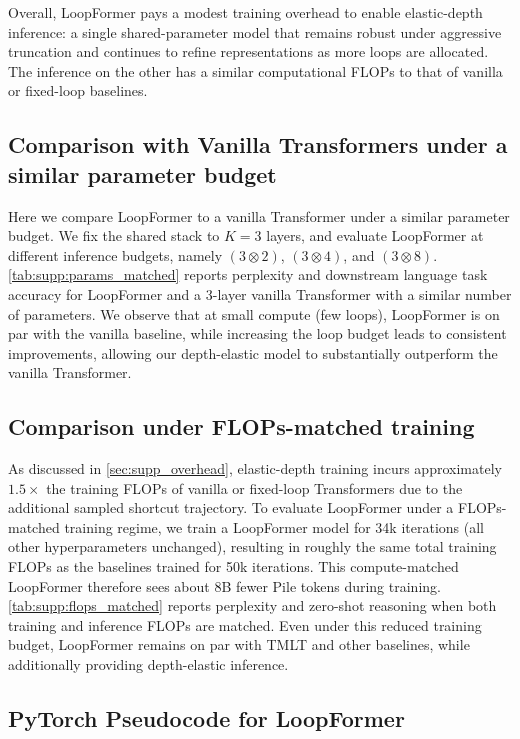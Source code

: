 Overall, LoopFormer pays a modest training overhead to enable elastic-depth inference: a single shared-parameter model that remains robust under aggressive truncation and continues to refine representations as more loops are allocated. The inference on the other has a similar computational FLOPs to that of vanilla or fixed-loop baselines.


\subsection{Comparison with Vanilla Transformers under a similar parameter budget}

Here we compare LoopFormer to a vanilla Transformer under a similar  parameter budget. We fix the shared stack to $K=3$ layers, and evaluate LoopFormer at different inference budgets, namely $(3\otimes2)$, $(3\otimes4)$, and $(3\otimes8)$. \autoref{tab:supp:params_matched} reports perplexity and downstream language task accuracy for LoopFormer and a 3-layer vanilla Transformer with a similar number of parameters. We observe that at small compute (few loops), LoopFormer is on par with the vanilla baseline, while increasing the loop budget leads to consistent improvements, allowing our depth-elastic model to substantially outperform the vanilla Transformer.




\subsection{Comparison under FLOPs-matched training}
As discussed in \autoref{sec:supp_overhead}, elastic-depth training incurs approximately $1.5\times$ the training FLOPs of vanilla or fixed-loop Transformers due to the additional sampled shortcut trajectory. To evaluate LoopFormer under a FLOPs-matched training regime, we train a LoopFormer model for 34k iterations (all other hyperparameters unchanged), resulting in roughly the same total training FLOPs as the baselines trained for 50k iterations. This compute-matched LoopFormer therefore sees about 8B fewer Pile tokens during training. \autoref{tab:supp:flops_matched} reports perplexity and zero-shot reasoning when both training and inference FLOPs are matched. Even under this reduced training budget, LoopFormer remains on par with TMLT and other baselines, while additionally providing depth-elastic inference.




\subsection{PyTorch Pseudocode for LoopFormer}
\label{appendix:implementation:loopformer}

